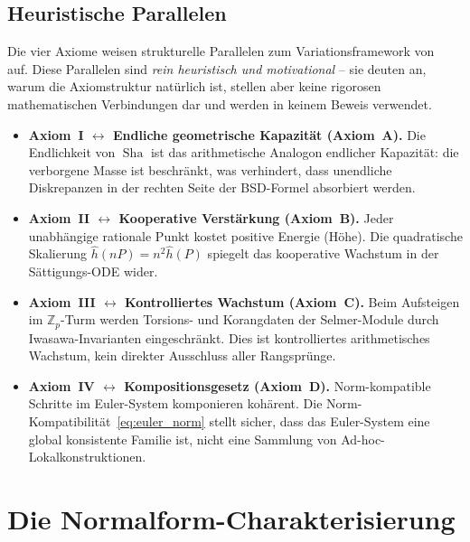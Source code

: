 \documentclass[aps,prd,twocolumn,superscriptaddress,nofootinbib,floatfix]{revtex4-2}
\theoremstyle{definition}
\theoremstyle{remark}
\DeclareMathOperator{\Sha}{Sha}
\begin{document}
\subsection{Heuristische Parallelen}
\label{sec:heuristic}

Die vier Axiome weisen strukturelle Parallelen zum Variationsframework von~\cite{FST-Unified2026} auf. Diese Parallelen sind \textit{rein heuristisch und motivational} -- sie deuten an, warum die Axiomstruktur natürlich ist, stellen aber keine rigorosen mathematischen Verbindungen dar und werden in keinem Beweis verwendet.

\begin{itemize}
\item \textbf{Axiom~I $\leftrightarrow$ Endliche geometrische Kapazität (Axiom~A).} Die Endlichkeit von $\Sha$ ist das arithmetische Analogon endlicher Kapazität: die \glqq verborgene Masse\grqq{} ist beschränkt, was verhindert, dass unendliche Diskrepanzen in der rechten Seite der BSD-Formel absorbiert werden.

\item \textbf{Axiom~II $\leftrightarrow$ Kooperative Verstärkung (Axiom~B).} Jeder unabhängige rationale Punkt kostet positive Energie (Höhe). Die quadratische Skalierung $\hat{h}(nP) = n^2 \hat{h}(P)$ spiegelt das kooperative Wachstum in der Sättigungs-ODE wider.

\item \textbf{Axiom~III $\leftrightarrow$ Kontrolliertes Wachstum (Axiom~C).} Beim Aufsteigen im $\mathbb{Z}_p$-Turm werden Torsions- und Korangdaten der Selmer-Module durch Iwasawa-Invarianten eingeschränkt. Dies ist kontrolliertes arithmetisches Wachstum, kein direkter Ausschluss aller Rangsprünge.

\item \textbf{Axiom~IV $\leftrightarrow$ Kompositionsgesetz (Axiom~D).} Norm-kompatible Schritte im Euler-System komponieren kohärent. Die Norm-Kompatibilität~\eqref{eq:euler_norm} stellt sicher, dass das Euler-System eine global konsistente Familie ist, nicht eine Sammlung von Ad-hoc-Lokalkonstruktionen.
\end{itemize}


\clearpage
\section{Die Normalform-Charakterisierung}
\label{sec:normal_form}
\end{document}
